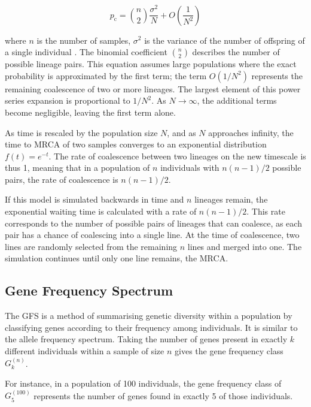 \begin{equation}
      p_\text{c} = \binom{n}{2} \frac{\sigma^2}{N} + O\left(\frac{1}{N^2}\right)
\end{equation}

where $n$ is the number of samples, $\sigma^2$ is the variance of the number of offspring of a single individual \cite{Kingman_1982}.
The binomial coefficient $\binom{n}{2}$ describes the number of possible lineage pairs.
This equation assumes large populations where the exact probability is approximated by the first term;
the term $O(1/N^2)$ represents the remaining coalescence of two or more lineages. The largest element of this power series expansion is proportional to $1/N^2$.
As $N \to \infty$, the additional terms become negligible, leaving the first term alone.

As time is rescaled by the population size $N$, and as $N$ approaches infinity, the time to \ac{MRCA} of two samples converges to an exponential distribution $f(t) = e^{-t}$.
The rate of coalescence between two lineages on the new timescale is thus 1, meaning that in a population of $n$ individuals with $n(n-1)/2$ possible pairs, the rate of coalescence is $n(n-1)/2$.

If this model is simulated backwards in time and $n$ lineages remain, the exponential waiting time is calculated with a rate of $n(n-1)/2$.
This rate corresponds to the number of possible pairs of lineages that can coalesce, as each pair has a chance of coalescing into a single line.
At the time of coalescence, two lines are randomly selected from the remaining $n$ lines and merged into one.
The simulation continues until only one line remains, the \ac{MRCA}.

\subsection{Gene Frequency Spectrum}
The \ac{GFS} is a method of summarising genetic diversity within a population by classifying genes according to their frequency among individuals.
It is similar to the allele frequency spectrum.
Taking the number of genes present in exactly $k$ different individuals within a sample of size $n$ gives the gene frequency class $G_k^{(n)}$.

For instance, in a population of 100 individuals, the gene frequency class of $G_5^{(100)}$ represents the number of genes found in exactly 5 of those individuals.

